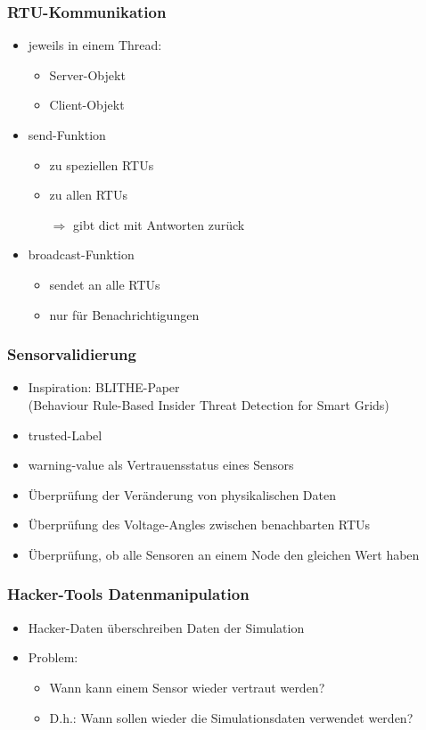 \documentclass{beamer}
\begin{document}
\begin{frame}
	\frametitle{RTU-Kommunikation}
	\begin{itemize}
		\item jeweils in einem Thread:
			\begin{itemize}
				\item Server-Objekt
				\item Client-Objekt
			\end{itemize}
		\item send-Funktion
			\begin{itemize}
				\item zu speziellen RTUs
				\item zu allen RTUs
				\item[$\Rightarrow$] gibt dict mit Antworten zurück
			\end{itemize}
		\item broadcast-Funktion
			\begin{itemize}
				\item sendet an alle RTUs
				\item nur für Benachrichtigungen
			\end{itemize}
	\end{itemize}
\end{frame}

\begin{frame}
	\frametitle{Sensorvalidierung}
	\begin{itemize}
		\item Inspiration: BLITHE-Paper \\
			(Behaviour Rule-Based Insider Threat Detection for Smart Grids)
		\item trusted-Label
		\item warning-value als Vertrauensstatus eines Sensors
		\item Überprüfung der Veränderung von physikalischen Daten
		\item Überprüfung des Voltage-Angles zwischen benachbarten RTUs
		\item Überprüfung, ob alle Sensoren an einem Node den gleichen Wert haben
	\end{itemize}
\end{frame}

\begin{frame}
	\frametitle{Hacker-Tools Datenmanipulation}
	\begin{itemize}
		\item Hacker-Daten überschreiben Daten der Simulation
		\item Problem:
			\begin{itemize}
				\item Wann kann einem Sensor wieder vertraut werden?
				\item D.h.: Wann sollen wieder die Simulationsdaten verwendet werden?
			\end{itemize}
	\end{itemize}
\end{frame}
\end{document}
